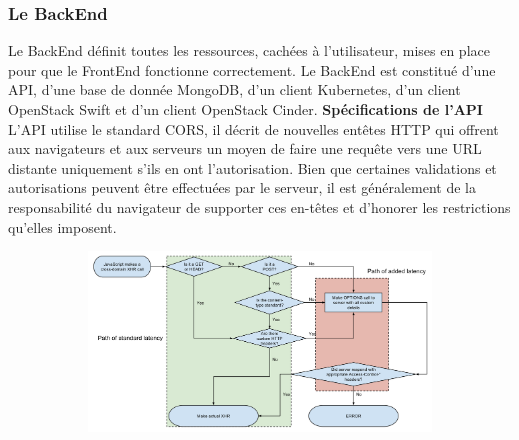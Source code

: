 \documentclass{article}
\begin{document}
\subsubsection{Le BackEnd}
Le BackEnd définit toutes les ressources, cachées à l'utilisateur, mises en place pour que le FrontEnd fonctionne correctement.
\newline
Le BackEnd est constitué d'une API, d'une base de donnée MongoDB, d'un client Kubernetes, d'un client OpenStack Swift et d'un client OpenStack Cinder.
\newline
\newline
\textbf{Spécifications de l'API}
\newline
\newline
L'API utilise le standard CORS, il décrit de nouvelles entêtes HTTP qui offrent aux navigateurs et aux serveurs un moyen de faire une requête vers une URL distante uniquement s'ils en ont l'autorisation. Bien que certaines validations et autorisations peuvent être effectuées par le serveur, il est généralement de la responsabilité du navigateur de supporter ces en-têtes et d'honorer les restrictions qu'elles imposent.
\newline
\begin{figure}[h!]
	\centering
  	\begin{subfigure}[b]{1.0\linewidth}
    \includegraphics[width=\linewidth]{cors.png}
  	\end{subfigure}
\end{figure}
\newpage
\end{document}
